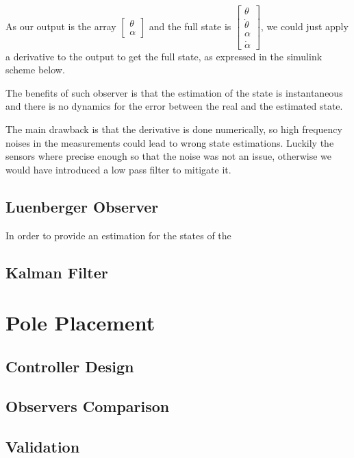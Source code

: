 As our output is the array 
$\begin{bmatrix}
    \theta \\
    \alpha
\end{bmatrix}$
and the full state is 
$\begin{bmatrix}
    \theta \\
    \dot\theta \\
    \alpha \\
    \dot\alpha 
\end{bmatrix}$,
we could just apply a derivative to the output to get the full state, as expressed in the simulink scheme below.


The benefits of such observer is that the estimation of the state is instantaneous and there is no dynamics for the error between the real and the estimated state.

The main drawback is that the derivative is done numerically, so high frequency noises in the measurements could lead to wrong state estimations.
Luckily the sensors where precise enough so that the noise was not an issue, otherwise we would have introduced a low pass filter to mitigate it.


\subsection{Luenberger Observer}

    In order to provide an estimation for the states of the 

\subsection{Kalman Filter}

\section{Pole Placement}

\subsection{Controller Design}

\subsection{Observers Comparison}

\subsection{Validation}

